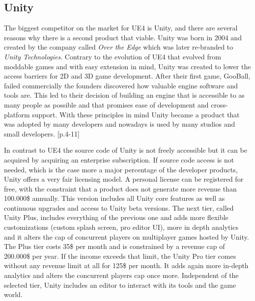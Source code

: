 \subsection{Unity}

The biggest competitor on the market for \ac{UE4} is Unity, and there are several reasons why there is a second product that viable. Unity was born in 2004 and created by the company called \textit{Over the Edge} which was later re-branded to \textit{Unity Technologies}. Contrary to the evolution of \ac{UE4} that evolved from moddable games and with easy extension in mind, Unity was created to lower the access barriers for 2D and 3D game development. After their first game, GooBall, failed commercially the founders discovered how valuable engine software and tools are. This led to their decision of building an engine that is accessible to as many people as possible and that promises ease of development and cross-platform support. With these principles in mind Unity became a product that was adopted by many developers and nowadays is used by many studios and small developers. \cite{Unity_His}[p.4-11]

In contrast to \ac{UE4} the source code of Unity is not freely accessible but it can be acquired by acquiring an enterprise subscription. If source code access is not needed, which is the case more a major percentage of the developer products, Unity offers a very fair licensing model. A personal license can be registered for free, with the constraint that a product does not generate more revenue than 100.000\$ annually. This version includes all Unity core features as well as continuous upgrades and access to Unity beta versions. The next tier, called Unity Plus, includes everything of the previous one and adds more flexible customizations (custom splash screen, pro editor UI), more in depth analytics and it alters the cap of concurrent players on multiplayer games hosted by Unity. The Plus tier costs 35\$ per month and is constrained by a revenue cap of 200.000\$ per year. If the income exceeds that limit, the Unity Pro tier comes without any revenue limit at all for 125\$ per month. It adds again more in-depth analytics and alters the concurrent players cap once more. Independent of the selected tier, Unity includes an editor to interact with its tools and the game world. 

\clearpage

